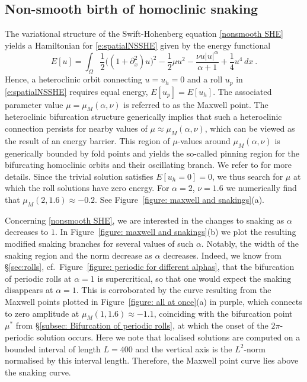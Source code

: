 \documentclass{article}
\numberwithin{equation}{section}
\begin{document}
\subsection{Non-smooth birth of homoclinic snaking}\label{subsec: homoclinic snaking}
The variational structure of the Swift-Hohenberg equation \eqref{nonsmooth SHE} yields a Hamiltonian for \eqref{e:spatialNSSHE} given by the energy functional
\begin{equation}\label{eq:energy_func}
E[u] = \int _{\Omega} \frac{1}{2} \bigl( (1+\partial_x^2) u \bigl)^2 - \frac{1}{2} \mu u^2 - \frac{\nu u|u|^\alpha}{\alpha+1} + \frac{1}{4}u^4 \,dx\ .
\end{equation}
Hence, a heteroclinic orbit connecting $u=u_h=0$ and a roll $u_p$ in \eqref{e:spatialNSSHE} requires equal energy, $E[u_p] = E[u_h]$. The associated  parameter value $\mu=\mu_M(\alpha,\nu)$ is referred to as the Maxwell point. The heteroclinic bifurcation structure generically implies that such a heteroclinic connection persists for nearby values of $\mu\approx \mu_M(\alpha,\nu)$, which can be viewed as the result of an energy barrier. This region of $\mu$-values around $\mu_M(\alpha,\nu)$ is generically bounded by fold points and yields the so-called pinning region for the bifurcating homoclinic orbits and their oscillating branch. We refer to \cite{BurkeKnobloch2006,BurkeKnobloch2007,Beck2009} for more details. 
Since the trivial solution satisfies $E[u_h = 0] =0$, we thus search for $\mu$ at which the roll solutions have zero energy. For $\alpha = 2$, $\nu=1.6$ we numerically find that $\mu_M(2,1.6) \approx -0.2$. 
See Figure~\ref{figure: maxwell and snakings}(a). 
		
Concerning \eqref{nonsmooth SHE}, we are interested in the changes to snaking as $\alpha$ decreases to $1$. In Figure~\ref{figure: maxwell and snakings}(b) we plot the resulting modified snaking branches for several values of such $\alpha$. Notably, the width of the snaking region and the norm decrease as $\alpha$ decreases. Indeed, we know from \S\ref{sec:rolls}, cf.\ Figure~\ref{figure: periodic for different alphas}, that the bifurcation of periodic rolls at $\alpha=1$ is supercritical, so that one would expect the snaking disappears at $\alpha=1$. 
This is corroborated by the curve resulting from the Maxwell points plotted in Figure~\ref{figure: all at once}(a) in purple, which connects to zero amplitude at $\mu_M(1,1.6) \approx -1.1$,  
coinciding with the bifurcation point $\mu^*$ from \S\ref{subsec: Bifurcation of periodic rolls}, at which the onset of the $2\pi$-periodic solution occurs. 
Here we note that localised solutions are computed on a bounded interval of length $L = 400$ and the vertical axis is the $L^2$-norm normalised by this interval length. Therefore, the Maxwell point curve lies above the snaking curve. 
 
\end{document}
